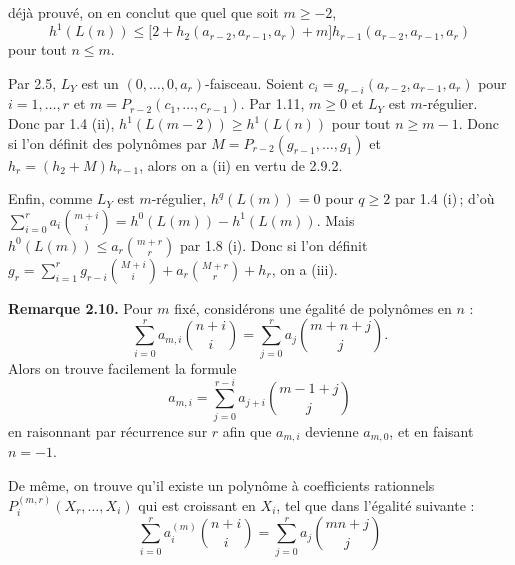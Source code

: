 
déjà
prouvé, on en conclut que quel que soit \(m\ge -2\),
\[
h^1(L(n))\le
\bigl[2+h_2(a_{r-2},a_{r-1},a_r)+m\bigr]
h_{r-1}(a_{r-2},a_{r-1},a_r)
\tag{2.9.2}
\]
pour tout \(n\le m\).

Par 2.5, \(L_Y\) est un \((0,\ldots,0,a_r)\)-faisceau. Soient \(c_i=g_{r-i}(a_{r-2},a_{r-1},a_r)\) pour \(i=1,\ldots,r\) et \(m=P_{r-2}(c_1,\ldots,c_{r-1})\). Par 1.11, \(m\ge0\) et \(L_Y\) est \(m\)-régulier. Donc par 1.4 (ii), \(h^1(L(m-2))\ge h^1(L(n))\) pour tout \(n\ge m-1\). Donc si l'on définit des polynômes par \(M=P_{r-2}(g_{r-1},\ldots,g_1)\) et \(h_r=(h_2+M)h_{r-1}\), alors on a (ii) en vertu de 2.9.2.

Enfin, comme \(L_Y\) est \(m\)-régulier, \(h^q(L(m))=0\) pour \(q\ge2\) par 1.4 (i)\,; d'où \(\sum_{i=0}^{r}a_i\binom{m+i}{i}=h^0(L(m))-h^1(L(m))\). Mais \(h^0(L(m))\le a_r\binom{m+r}{r}\) par 1.8 (i). Donc si l'on définit \(g_r=\sum_{i=1}^{r}g_{r-i}\binom{M+i}{i}+a_r\binom{M+r}{r}+h_r\), on a (iii).

\textbf{Remarque 2.10.} Pour \(m\) fixé, considérons une égalité de polynômes en \(n\) :
\[
\sum_{i=0}^{r}a_{m,i}\binom{n+i}{i}
=
\sum_{j=0}^{r}a_j\binom{m+n+j}{j}.
\]
Alors on trouve facilement la formule
\[
a_{m,i}=\sum_{j=0}^{r-i}a_{j+i}\binom{m-1+j}{j}
\]
en raisonnant par récurrence sur \(r\) afin que \(a_{m,i}\) devienne \(a_{m,0}\), et en faisant \(n=-1\).

De même, on trouve qu'il existe un polynôme à coefficients rationnels \(P_i^{(m,r)}(X_r,\ldots,X_i)\) qui est croissant en \(X_i\), tel que dans l'égalité suivante :
\[
\sum_{i=0}^{r}a_i^{(m)}\binom{n+i}{i}
=
\sum_{j=0}^{r}a_j\binom{mn+j}{j}
\]
